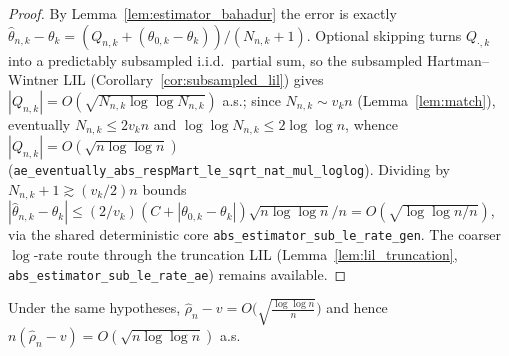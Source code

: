 \begin{proof}\leanok
{}
By Lemma~\ref{lem:estimator_bahadur} the error is exactly
$\hat{\theta}_{n,k}-\theta_k = (Q_{n,k}+(\theta_{0,k}-\theta_k))/(N_{n,k}+1)$. Optional skipping turns
$Q_{\cdot,k}$ into a predictably subsampled i.i.d.\ partial sum, so the subsampled Hartman--Wintner
LIL (Corollary~\ref{cor:subsampled_lil}) gives $|Q_{n,k}| = O(\sqrt{N_{n,k}\log\log N_{n,k}})$ a.s.;
since $N_{n,k}\sim v_k n$ (Lemma~\ref{lem:match}), eventually $N_{n,k}\le 2v_k n$ and
$\log\log N_{n,k}\le 2\log\log n$, whence $|Q_{n,k}| = O(\sqrt{n\log\log n})$
(\texttt{ae\_eventually\_abs\_respMart\_le\_sqrt\_nat\_mul\_loglog}). Dividing by $N_{n,k}+1
\gtrsim (v_k/2)n$ bounds $|\hat{\theta}_{n,k}-\theta_k| \le
(2/v_k)(C+|\theta_{0,k}-\theta_k|)\sqrt{n\log\log n}/n = O(\sqrt{\log\log n / n})$, via the shared
deterministic core \texttt{abs\_estimator\_sub\_le\_rate\_gen}. The coarser $\log$-rate route through
the truncation LIL (Lemma~\ref{lem:lil_truncation}, \texttt{abs\_estimator\_sub\_le\_rate\_ae})
remains available.
\end{proof}

\begin{lemma}\label{lem:rho_rate}
\leanok
{}
Under the same hypotheses,
$\hat{\rho}_n - v = O\!\big(\sqrt{\tfrac{\log\log n}{n}}\big)$ and hence
$n(\hat{\rho}_n - v) = O(\sqrt{n\log\log n})$ a.s.
\end{lemma}

